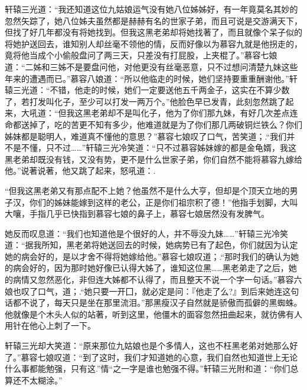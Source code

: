 \documentclass[12pt,oneside]{book}
\begin{document}
轩辕三光道：``我还知道这位九姑娘运气没有她八位姊姊好，有一年竟莫名其妙的忽然矢踪了，她八位姊夫虽然都是赫赫有名的世家子弟，而且可说是交游满天下，但找了好几年都没有将她找到。但我这黑老弟却将她找著了，而且就像个呆子似的将她护送回去，谁知别人却丝毫不领他的情，反而好像以为慕容九就是他拐走的，竟将他当成个小偷般盘问了两三天，只差没有打屁股，上夹棍了。''慕容七娘道：``二姊和三姊不是要盘问他，对他更没有丝毫恶意，只不过想问清楚九妹这些年来的遭遇而已。''慕容八娘道：``所以他临走的时候，她们坚持要重重酬谢他。''轩辕三光道：``不错，他走的时候，她们一定要送他五千两金子，这实在不算少数了，若打发叫化子，至少可以打发一两万个。''他脸色早已发青，此刻忽然跳了起来，大吼道：``但我这黑老弟却不是叫化子，他为了你们那九妹，有好几次差点连命都送掉了，吃的苦更不知有多少，他难道就是为了你们那几两破铜烂铁么？你们姊妹都是聪明人，难道真不懂他的意思？''慕容七娘叹了口气，苦笑道；.``我们并不是不懂，只不过\ldots\ldots{}''轩辕三光冷笑道：``只不过慕容姊妹嫁的都是金龟婿，我这黑老弟却既没有钱，又没有势，更不是什么世家子弟，你们自然不能将慕容九嫁给他。''说著说著，他又跳了起来，怒吼道：.

``但我这黑老弟又有那点配不上她？他虽然不是什么大亨，但却是个顶天立地的男子汉，你们的姊妹能嫁到这样的老公，正是你们祖宗积了德！''他指手划脚，大叫大嚷，手指几乎已快指到慕容七娘的鼻子上，慕容七娘居然没有发脾气。

她反而叹息道：``我们也知道他是个很好的人，并不辱没九妹\ldots\ldots{}''轩辕三光冷笑道：``据我所知，黑老弟将她送回去的时候，她病势已有了起色，你们就因为认定她的病会好的，是以才舍不得将她嫁给他。''慕容七娘叹道；.``那时我们的确认为她的病会好的，因为那时她好像已认得大姊了，谁知这位黑\ldots\ldots 黑老弟走了之后，她的病情又忽然恶化，非但连大姊都不认得了，而且整天不说一个字一句话。''慕容六娘也叹了口气，道；.``她只要一开囗，就必定是问：『他走了么?』到后来她连这句话都不说了，每天只是坐在那里流泪。''那黑瘦汉子自然就是骄傲而孤僻的黑蜘蛛。他就像是个木头人似的站著，听到这里，他僵木的面容忽然扭曲起来，就彷佛有人用针在他心上刺了一下。

轩辕三光却大笑道：``原来那位九姑娘也是个多情人，这也不枉黑老弟对她那么好了。''慕容七娘叹道：``到了这时，我们才知道她的心意，我们自然也知道世上无论什么事都能勉强，只有这.''情``之一字是谁也勉强不得。''轩辕三光附和道：``你们总算还不太糊涂。''
\end{document}
